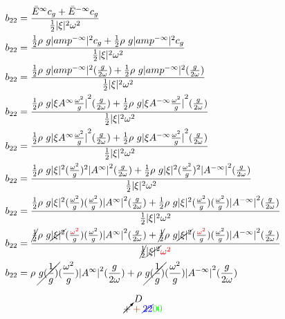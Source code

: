 \begin{align}
	b_{22} &=  \frac{\bar{E}^{\infty} c_g + \bar{E}^{-\infty} c_g }{\frac{1}{2} |\xi|^2 \omega^2}\\
	b_{22} &=  \frac{\frac{1}{2}\rho g |amp^{-\infty}|^2  c_g + \frac{1}{2}\rho g |amp^{-\infty}|^2 c_g }{\frac{1}{2} |\xi|^2 \omega^2}\\
	b_{22} &=  \frac{\frac{1}{2}\rho g |amp^{-\infty}|^2  (\frac{g}{2\omega}) + \frac{1}{2}\rho g |amp^{-\infty}|^2 (\frac{g}{2\omega}) }{\frac{1}{2} |\xi|^2 \omega^2}\\
	b_{22} &=  \frac{\frac{1}{2}\rho g {|\xi A^{\infty} \frac{\omega^2}{g}|}^2  (\frac{g}{2\omega}) + \frac{1}{2}\rho g {|\xi A^{-\infty} \frac{\omega^2}{g}|}^2  (\frac{g}{2\omega}) }{\frac{1}{2} |\xi|^2 \omega^2}\\
	b_{22} &=  \frac{\frac{1}{2}\rho g {|\xi A^{\infty} \frac{\omega^2}{g}|}^2  (\frac{g}{2\omega}) + \frac{1}{2}\rho g {|\xi A^{-\infty} \frac{\omega^2}{g}|}^2  (\frac{g}{2\omega}) }{\frac{1}{2} |\xi|^2 \omega^2}\\
b_{22} &=  \frac{\frac{1}{2}\rho g |\xi|^2 (\frac{\omega^2}{g})^2 {| A^{\infty} |}^2  (\frac{g}{2\omega}) + \frac{1}{2}\rho g |\xi|^2  (\frac{\omega^2}{g})^2 {| A^{-\infty}|}^2  (\frac{g}{2\omega}) }{\frac{1}{2} |\xi|^2 \omega^2}\\
b_{22} &=  \frac{\frac{1}{2}\rho g |\xi|^2 (\frac{\omega^2}{g})(\frac{\omega^2}{g}) {| A^{\infty} |}^2  (\frac{g}{2\omega}) + \frac{1}{2}\rho g |\xi|^2  (\frac{\omega^2}{g})(\frac{\omega^2}{g}) {| A^{-\infty}|}^2  (\frac{g}{2\omega}) }{\frac{1}{2} |\xi|^2 \omega^2}\\
b_{22} &=  \frac{ \cancel{\frac{1}{2}}\rho g \cancel{|\xi|^2} (\frac{\color{red}{\omega^2}}{g})(\frac{\omega^2}{g}) {| A^{\infty} |}^2  (\frac{g}{2\omega}) + \cancel{\frac{1}{2}}\rho g \cancel{|\xi|^2}  (\frac{\color{red}{\omega^2}}{g})(\frac{\omega^2}{g}) {| A^{-\infty}|}^2  (\frac{g}{2\omega}) }{\cancel{\frac{1}{2}} \cancel{|\xi|^2} \color{red}{\omega^2}}\\
b_{22} &=   \rho \cancel{g  (\frac{1}{g})}(\frac{\omega^2}{g}) {| A^{\infty} |}^2  (\frac{g}{2\omega}) + \rho \cancel{g   (\frac{1}{g})}(\frac{\omega^2}{g}) {| A^{-\infty}|}^2  (\frac{g}{2\omega}) \\
\end{align}

\[
\cancelto{D} + \color{red} + \color{blue}\cancel{22}  \color{green}00
\]
